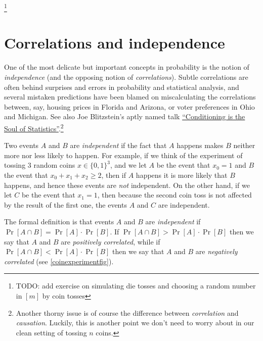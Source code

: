 \footnote{TODO: add exercise on simulating die tosses and choosing a
  random number in \([m]\) by coin tosses}

\section{Correlations and independence}\label{Correlations-and-independ}

One of the most delicate but important concepts in probability is the
notion of \emph{independence} (and the opposing notion of
\emph{correlations}). Subtle correlations are often behind surprises and
errors in probability and statistical analysis, and several mistaken
predictions have been blamed on miscalculating the correlations between,
say, housing prices in Florida and Arizona, or voter preferences in Ohio
and Michigan. See also Joe Blitzstein's aptly named talk
\href{https://youtu.be/dzFf3r1yph8}{``Conditioning is the Soul of
Statistics''}.\footnote{Another thorny issue is of course the difference
  between \emph{correlation} and \emph{causation}. Luckily, this is
  another point we don't need to worry about in our clean setting of
  tossing \(n\) coins.}

Two events \(A\) and \(B\) are \emph{independent} if the fact that \(A\)
happens makes \(B\) neither more nor less likely to happen. For example,
if we think of the experiment of tossing \(3\) random coins
\(x\in \{0,1\}^3\), and we let \(A\) be the event that \(x_0=1\) and
\(B\) the event that \(x_0 + x_1 + x_2 \geq 2\), then if \(A\) happens
it is more likely that \(B\) happens, and hence these events are
\emph{not} independent. On the other hand, if we let \(C\) be the event
that \(x_1=1\), then because the second coin toss is not affected by the
result of the first one, the events \(A\) and \(C\) are independent.

The formal definition is that events \(A\) and \(B\) are
\emph{independent} if \(\Pr[A \cap B]=\Pr[A] \cdot \Pr[B]\). If
\(\Pr[A \cap B] > \Pr[A]\cdot \Pr[B]\) then we say that \(A\) and \(B\)
are \emph{positively correlated}, while if
\(\Pr[ A \cap B] < \Pr[A] \cdot \Pr[B]\) then we say that \(A\) and
\(B\) are \emph{negatively correlated} (see \cref{coinexperimentfig}).


